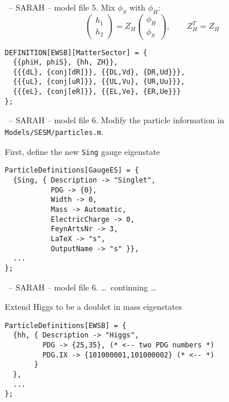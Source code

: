 \documentclass[11pt]{beamer}
\begin{document}

\begin{frame}[fragile]{\insertsection\ -- SARAH -- model file}
  5. Mix $\phi_S$ with $\phi_H$:
  \begin{equation*}
    \begin{pmatrix}
      h_1 \\ h_2
    \end{pmatrix}
    =
    Z_H
    \begin{pmatrix}
      \phi_H \\ \phi_S
    \end{pmatrix},
    \qquad
    Z_H^T = Z_H
  \end{equation*}
  \begin{lstlisting}
DEFINITION[EWSB][MatterSector] = {
  {{phiH, phiS}, {hh, ZH}},
  {{{dL}, {conj[dR]}}, {{DL,Vd}, {DR,Ud}}},
  {{{uL}, {conj[uR]}}, {{UL,Vu}, {UR,Uu}}},
  {{{eL}, {conj[eR]}}, {{EL,Ve}, {ER,Ue}}}
};\end{lstlisting}
\end{frame}


\begin{frame}[fragile]{\insertsection\ -- SARAH -- model file}
  6. Modify the particle information in
  \texttt{Models/SESM/particles.m}.

  \bigskip

  First, define the new \texttt{Sing} gauge eigenstate
  \begin{lstlisting}
ParticleDefinitions[GaugeES] = {
  {Sing, { Description -> "Singlet",
           PDG -> {0},
           Width -> 0,
           Mass -> Automatic,
           ElectricCharge -> 0,
           FeynArtsNr -> 3,
           LaTeX -> "s",
           OutputName -> "s" }},
  ...
};\end{lstlisting}
\end{frame}


\begin{frame}[fragile]{\insertsection\ -- SARAH -- model file}
  6. \ldots\ continuing \ldots

  \bigskip

  Extend Higgs to be a doublet in mass eigenstates
  \begin{lstlisting}
ParticleDefinitions[EWSB] = {
  {hh, { Description -> "Higgs",
         PDG -> {25,35}, (* <-- two PDG numbers *)
         PDG.IX -> {101000001,101000002} (* <-- *)
       }
  },
  ...
};\end{lstlisting}
\end{frame}
\end{document}
